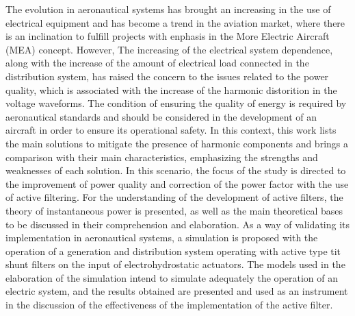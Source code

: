 The evolution in aeronautical systems has brought an increasing in the use of electrical equipment and has become a trend in the aviation market, where there is an inclination to fulfill projects with enphasis in the More Electric Aircraft (MEA) concept. However, The increasing of the electrical system dependence, along with the increase of the amount of electrical load connected in the distribution system, has raised the concern to the issues related to the power quality, which is associated with the increase of the harmonic distorition in the voltage waveforms.
The condition of ensuring the quality of energy is required by aeronautical standards and should be considered in the development of an aircraft in order to ensure its operational safety. In this context, this work lists the main solutions to mitigate the presence of harmonic components and brings a comparison with their main characteristics, emphasizing the strengths and weaknesses of each solution. In this scenario, the focus of the study is directed to the improvement of power quality and correction of the power factor with the use of active filtering. For the understanding of the development of active filters, the theory of instantaneous power is presented, as well as the main theoretical bases to be discussed in their comprehension and elaboration. As a way of validating its implementation in aeronautical systems, a simulation is proposed with the operation of a generation and distribution system operating with active type tit shunt filters on the input of electrohydrostatic actuators. The models used in the elaboration of the simulation intend to simulate adequately the operation of an electric system, and the results obtained are presented and used as an instrument in the discussion of the effectiveness of the implementation of the active filter.